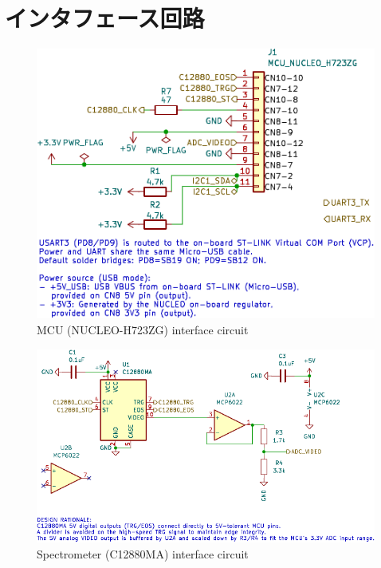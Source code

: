 \documentclass[main]{subfiles}
\begin{document}
\chapter{インタフェース回路}
\label{sec:appendix_figs}

\begin{figure}[ht]
  \centering
  \includegraphics[width=0.8\linewidth]{figures/2/AGV_Multisensor-MCU_NUCLEO_H723ZG.pdf}
  \caption{MCU (NUCLEO-H723ZG) interface circuit}
  \label{fig:mcu_circuit}
\end{figure}

\begin{figure}[ht]
  \centering
  \includegraphics[width=0.8\linewidth]{figures/2/AGV_Multisensor-Spectrometer_C12880MA.pdf}
  \caption{Spectrometer (C12880MA) interface circuit}
  \label{fig:c12880ma_circuit}
\end{figure}
\end{document}
